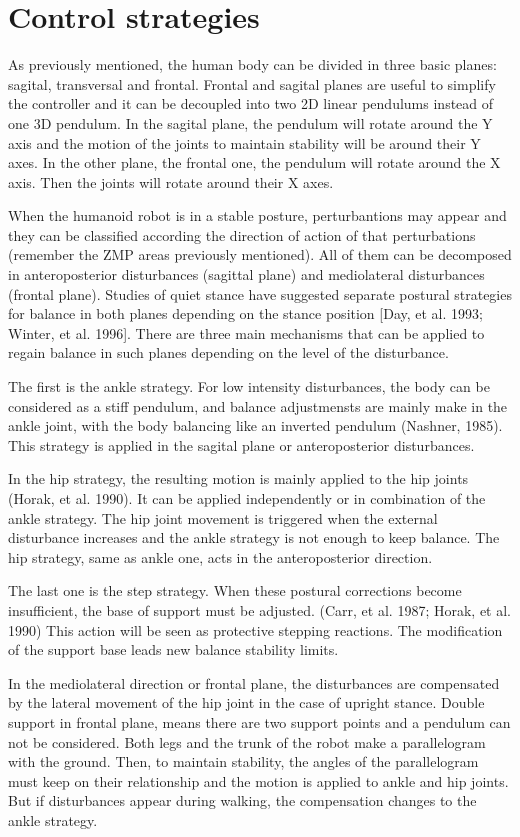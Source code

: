 




\section{Control strategies}
As previously mentioned, the human body can be divided in three basic planes: sagital, transversal and frontal. Frontal and sagital planes are useful to simplify the controller and it can be decoupled into two 2D linear pendulums instead of one 3D pendulum. In the sagital plane, the pendulum will rotate around the Y axis and the motion of the joints to maintain stability will be around their Y axes. In the other plane, the frontal one, the pendulum will rotate around the X axis.  Then the joints will rotate around their X axes.

When the humanoid robot is in a stable posture, perturbantions may appear and they can be classified according the direction of action of that perturbations (remember the ZMP areas previously mentioned). All of them can be decomposed in anteroposterior disturbances (sagittal plane) and mediolateral disturbances (frontal plane). Studies of quiet stance have suggested separate postural strategies for balance in both planes depending on the stance position [Day, et al. 1993; Winter, et al. 1996]. There are three main mechanisms that can be applied to regain balance in such planes depending on the level of the disturbance.

The first is the ankle strategy. For low intensity disturbances, the body can be considered as a stiff pendulum, and balance adjustmensts are mainly make in the ankle joint, with the body balancing like an inverted pendulum (Nashner, 1985). This strategy is applied in the sagital plane or anteroposterior disturbances.

In the hip strategy, the resulting motion is mainly applied to the hip joints (Horak, et al. 1990). It can be applied independently or in combination of the ankle strategy. The hip joint movement is triggered when the external disturbance increases and the ankle strategy is not enough to keep balance. The hip strategy, same as ankle one, acts in the anteroposterior direction.

The last one is the step strategy. When these postural corrections become insufficient, the base of support must be adjusted. (Carr, et al. 1987; Horak, et al. 1990) This action will be seen as protective stepping reactions. The modification of the support base leads new balance stability limits.

In the mediolateral direction or frontal plane, the disturbances are compensated by the lateral movement of the hip joint in the case of upright stance. Double support in frontal plane, means there are two support points and a pendulum can not be considered. Both legs and the trunk of the robot make a parallelogram with the ground. Then, to maintain stability, the angles of the parallelogram must keep on their relationship and the motion is applied to ankle and hip joints. But if disturbances appear during walking, the compensation changes to the ankle strategy.
